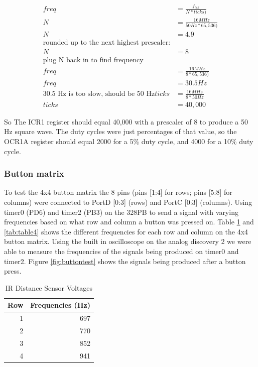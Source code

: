 \documentclass{article}
\begin{document}
        \begin{equation}
            \begin{split}\label{eq:timer1}
            freq &= \frac{f_{clk}}{N * ticks)} \\
            N &= \frac{16 MHz}{50 Hz * 65,536)} \\
            N &= 4.9\\
            \text{rounded up to the next highest prescaler:}\\
            N &= 8\\
            \text{plug N back in to find frequency}\\
            freq &= \frac{16 MHz}{8 * 65,536)} \\
            freq &= 30.5 Hz\\
            \text{30.5 Hz is too slow, should be 50 Hz}
            ticks &= \frac{16 MHz}{8 * 50 Hz}\\
            ticks &= 40,000
            \end{split}
        \end{equation}
        
        So The ICR1 register should equal 40,000 with a prescaler of 8 to produce a 50 Hz square wave. The duty cycles were just percentages of that value, so the OCR1A register should equal 2000 for a 5\% duty cycle, and 4000 for a 10\% duty cycle.
        
        \subsubsection{Button matrix}
        To test the 4x4 button matrix the 8 pins (pins [1:4] for rows; pins [5:8] for columns) were connected to PortD [0:3] (rows) and PortC [0:3] (columns). Using timer0 (PD6) and timer2 (PB3) on the 328PB to send a signal with varying frequencies based on what row and column a button was pressed on. Table \ref{tab:table1} and \ref{tab:table4} shows the different frequencies for each row and column on the 4x4 button matrix. Using the built in oscilloscope on the analog discovery 2 we were able to measure the frequencies of the signals being produced on timer0 and timer2. Figure \ref{fig:buttontest} shows the signals being produced after a button press.
        
        \begin{table}[!ht]
  	        \begin{center}
                \caption{IR Distance Sensor Voltages}
    		    \label{tab:table1}
    		    \begin{tabular}{r|r}
      			    \textbf{Row} & \textbf{Frequencies (Hz)} \\
			        \hline
      			    1 & 697\\
      			    2 & 770\\
      			    3 & 852\\
      			    4 & 941\\
   			    \end{tabular}
  	        \end{center}
	    \end{table}
	    
\end{document}
